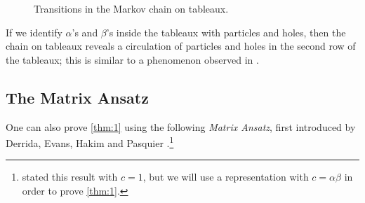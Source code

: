 \documentclass[11pt]{amsart}
\theoremstyle{definition}
\theoremstyle{remark}
\begin{document}
\begin{figure}
{
}
%
	\caption{Transitions in the Markov chain on tableaux.}\label{fig:5}
\end{figure}

If we identify $\alpha$'s and $\beta$'s inside the tableaux
with particles and holes, then 
the chain on tableaux reveals a circulation of particles and holes
in the second row of the tableaux; this is similar to a phenomenon
observed in \cite{DS}.




\subsection{The Matrix Ansatz}
One can also  prove \cref{thm:1} using
the following \emph{Matrix Ansatz}, first introduced by 
 Derrida, Evans, Hakim and Pasquier \cite{Derrida1}.\footnote{\cite{Derrida1}
stated this result with $c=1$, but we will use
a representation with $c=\alpha \beta$ in order to 
prove \cref{thm:1}.}
\end{document}
